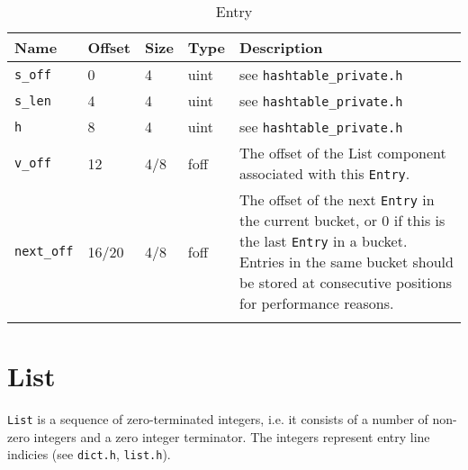 \documentclass[a4paper,12pt]{article}
\begin{document}
\begin{longtable}{|p{1in}|p{0.6in}|p{0.6in}|p{0.6in}|p{2.7in}|}
\hline
{\bf Name} & {\bf Offset} & {\bf Size} & {\bf Type} & {\bf Description}\\
\hline
\endhead

\verb#s_off# & 0 & 4 & uint & see \verb#hashtable_private.h#

\\
\hline

\verb#s_len# & 4 & 4 & uint & see \verb#hashtable_private.h#

\\
\hline

\verb#h# & 8 & 4 & uint & see \verb#hashtable_private.h#

\\
\hline

\verb#v_off# & 12 & 4/8 & foff & The offset of the List component associated
with this \verb#Entry#.

\\
\hline

\verb#next_off# & 16/20 & 4/8 & foff & The offset of the next \verb#Entry# in the
current bucket, or 0 if this is the last \verb#Entry# in a
bucket. Entries in the same bucket should be stored at consecutive
positions for performance reasons.

\\
\hline
\caption{Entry}
\end{longtable}


\section{List}

\verb#List# is a sequence of zero-terminated integers, i.e. it
consists of a number of non-zero integers and a zero integer
terminator. The integers represent entry line indicies (see
\verb#dict.h#, \verb#list.h#).
\end{document}
